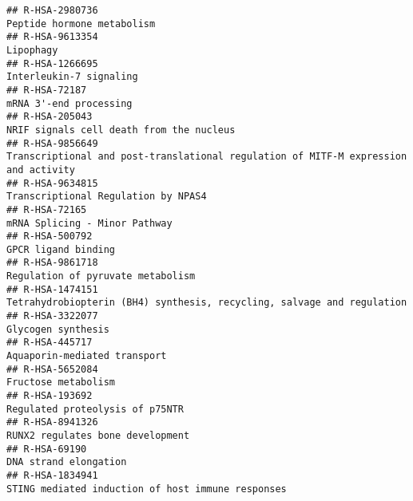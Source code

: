 \documentclass[
]{article}
\begin{document}
\begin{verbatim}
## R-HSA-2980736                                                                                                           Peptide hormone metabolism
## R-HSA-9613354                                                                                                                            Lipophagy
## R-HSA-1266695                                                                                                              Interleukin-7 signaling
## R-HSA-72187                                                                                                                 mRNA 3'-end processing
## R-HSA-205043                                                                                              NRIF signals cell death from the nucleus
## R-HSA-9856649                                                  Transcriptional and post-translational regulation of MITF-M expression and activity
## R-HSA-9634815                                                                                                  Transcriptional Regulation by NPAS4
## R-HSA-72165                                                                                                          mRNA Splicing - Minor Pathway
## R-HSA-500792                                                                                                                   GPCR ligand binding
## R-HSA-9861718                                                                                                    Regulation of pyruvate metabolism
## R-HSA-1474151                                                               Tetrahydrobiopterin (BH4) synthesis, recycling, salvage and regulation
## R-HSA-3322077                                                                                                                   Glycogen synthesis
## R-HSA-445717                                                                                                          Aquaporin-mediated transport
## R-HSA-5652084                                                                                                                  Fructose metabolism
## R-HSA-193692                                                                                                       Regulated proteolysis of p75NTR
## R-HSA-8941326                                                                                                     RUNX2 regulates bone development
## R-HSA-69190                                                                                                                  DNA strand elongation
## R-HSA-1834941                                                                                    STING mediated induction of host immune responses

\end{verbatim}
\end{document}
